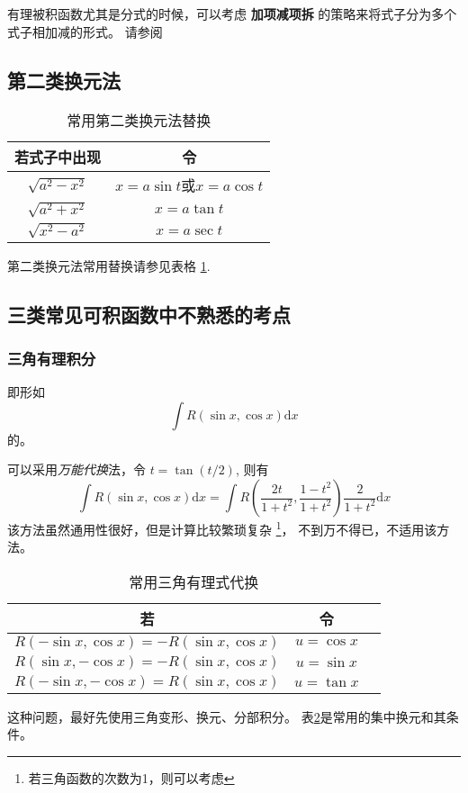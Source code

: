 有理被积函数尤其是分式的时候，可以考虑 \textbf{加项减项拆}
的策略来将式子分为多个式子相加减的形式。
请参阅\cite[page 98, pdf 109, example 7]{we}

\subsection{第二类换元法}

\begin{table}
    \centering
    \begin{tabular}{cc}
        \toprule
        若式子中出现 & 令 \\
        \midrule
        $\sqrt{a^2 - x^2}$ & $x = a \sin t$或$x = a \cos t$ \\
        $\sqrt{a^2 + x^2}$ & $x = a \tan t$ \\
        $\sqrt{x^2 - a^2}$ & $x = a \sec t$ \\
        \bottomrule
    \end{tabular}
    \caption{常用第二类换元法替换}
    \label{tab:useful-sec-type-substitutions}
\end{table}
第二类换元法常用替换请参见表格 \ref{tab:useful-sec-type-substitutions}.

\subsection{三类常见可积函数中不熟悉的考点}

\subsubsection{三角有理积分}

即形如
\[
    \int R(\sin x, \cos x) \mbox{d} x 
\]
的。

可以采用\textit{万能代换}法，令 $t = \tan (t/2)$, 则有
\begin{equation}
    \int R(\sin x, \cos x) \mbox{d} x 
    = \int R\left(\dfrac{2t}{1+t^2}, \dfrac{1-t^2}{1+t^2}\right) 
    \dfrac{2}{1+t^2} \mbox{d} x
\end{equation}
该方法虽然通用性很好，但是计算比较繁琐复杂
\footnote{若三角函数的次数为1，则可以考虑}，
不到万不得已，不适用该方法。

\begin{table}
    \centering
    \begin{tabular}{ccc}
        \toprule
        若 & 令 \\
        \midrule
        $R(- \sin x,   \cos x) = -R(\sin x, \cos x)$ & $u = \cos x$ \\
        $R(  \sin x, - \cos x) = -R(\sin x, \cos x)$ & $u = \sin x$ \\
        $R(- \sin x, - \cos x) =  R(\sin x, \cos x)$ & $u = \tan x$ \\
        \bottomrule
    \end{tabular}
    \caption{常用三角有理式代换}
    \label{tab:useful-tri-rational-substitutions}
\end{table}
这种问题，最好先使用三角变形、换元、分部积分。
表\ref{tab:useful-tri-rational-substitutions}是常用的集中换元和其条件。

